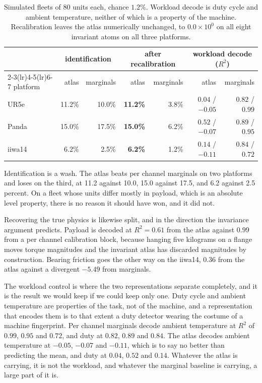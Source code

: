 \documentclass[11pt]{article}
\begin{document}
\begin{table}[t]
\centering
\begin{tabular}{lrrrrrr}
\toprule
& \multicolumn{2}{c}{identification} & \multicolumn{2}{c}{after recalibration}
& \multicolumn{2}{c}{workload decode ($R^2$)} \\
\cmidrule(lr){2-3}\cmidrule(lr){4-5}\cmidrule(lr){6-7}
platform & atlas & marginals & atlas & marginals & atlas & marginals \\
\midrule
UR5e    & 11.2\% & 10.0\% & \textbf{11.2\%} & 3.8\% & $0.04$ / $-0.05$ & $0.82$ / $0.99$ \\
Panda   & 15.0\% & 17.5\% & \textbf{15.0\%} & 6.2\% & $0.52$ / $-0.07$ & $0.89$ / $0.95$ \\
iiwa14  &  6.2\% &  2.5\% & \textbf{6.2\%}  & 1.2\% & $0.14$ / $-0.11$ & $0.84$ / $0.72$ \\
\bottomrule
\end{tabular}
\caption{Simulated fleets of 80 units each, chance $1.2\%$. Workload decode is
duty cycle and ambient temperature, neither of which is a property of the
machine. Recalibration leaves the atlas numerically unchanged, to
$0.0\times10^{0}$ on all eight invariant atoms on all three platforms.}
\label{tab:fleet}
\end{table}

Identification is a wash. The atlas beats per channel marginals on two
platforms and loses on the third, at 11.2 against 10.0, 15.0 against 17.5, and
6.2 against 2.5 percent. On a fleet whose units differ mostly in payload, which
is an absolute level property, there is no reason it should have won, and it
did not.

Recovering the true physics is likewise split, and in the direction the
invariance argument predicts. Payload is decoded at $R^2=0.61$ from the atlas
against $0.99$ from a per channel calibration block, because hanging five
kilograms on a flange moves torque magnitudes and the invariant atlas has
discarded magnitudes by construction. Bearing friction goes the other way on
the iiwa14, $0.36$ from the atlas against a divergent $-5.49$ from marginals.

The workload control is where the two representations separate completely, and
it is the result we would keep if we could keep only one. Duty cycle and
ambient temperature are properties of the task, not of the machine, and a
representation that encodes them is to that extent a duty detector wearing the
costume of a machine fingerprint. Per channel marginals decode ambient
temperature at $R^2$ of $0.99$, $0.95$ and $0.72$, and duty at $0.82$, $0.89$
and $0.84$. The atlas decodes ambient temperature at $-0.05$, $-0.07$ and
$-0.11$, which is to say no better than predicting the mean, and duty at
$0.04$, $0.52$ and $0.14$. Whatever the atlas is carrying, it is not the
workload, and whatever the marginal baseline is carrying, a large part of it
is.
\end{document}
